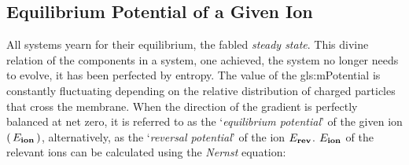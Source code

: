 \documentclass[../../Orator]{subfiles}
\begin{document}
\subsection{Equilibrium Potential of a Given Ion}
\begingroup
\allowdisplaybreaks
All systems yearn for their equilibrium, the fabled \textit{steady state}. This divine relation of the components in a system, one achieved, the system no longer needs to evolve, it has been perfected by entropy. 
The value of the \gls{gls:mPotential} is constantly fluctuating depending on the relative distribution of charged particles that cross the membrane. 
When the direction of the gradient is perfectly balanced at net zero, it is referred to as the `\textit{equilibrium potential}' of the given ion \(\left(\,E_{\mathbf{ion}}\,\right)\), alternatively, as the `\textit{reversal potential}' of the ion \(E_{\mathbf{rev}}\). 
\(E_{\mathbf{ion}}\) of the relevant ions can be calculated using the \textit{Nernst} equation:
\end{document}
